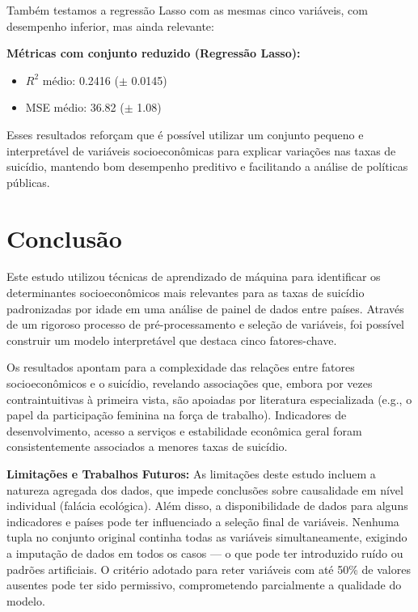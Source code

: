 \documentclass[letterpaper]{article}
\begin{document}
Também testamos a regressão Lasso com as mesmas cinco variáveis, com desempenho inferior, mas ainda relevante:

\vspace{0.5em}
\noindent
\textbf{Métricas com conjunto reduzido (Regressão Lasso):}
\begin{itemize}
\item $R^2$ médio: 0.2416 ($\pm$ 0.0145)
\item MSE médio: 36.82 ($\pm$ 1.08)
\end{itemize}

Esses resultados reforçam que é possível utilizar um conjunto pequeno e interpretável de variáveis socioeconômicas para explicar variações nas taxas de suicídio, mantendo bom desempenho preditivo e facilitando a análise de políticas públicas.

\section{Conclusão}

Este estudo utilizou técnicas de aprendizado de máquina para identificar os determinantes socioeconômicos mais relevantes para as taxas de suicídio padronizadas por idade em uma análise de painel de dados entre países. Através de um rigoroso processo de pré-processamento e seleção de variáveis, foi possível construir um modelo interpretável que destaca cinco fatores-chave.

Os resultados apontam para a complexidade das relações entre fatores socioeconômicos e o suicídio, revelando associações que, embora por vezes contraintuitivas à primeira vista, são apoiadas por literatura especializada (e.g., o papel da participação feminina na força de trabalho). Indicadores de desenvolvimento, acesso a serviços e estabilidade econômica geral foram consistentemente associados a menores taxas de suicídio.

\textbf{Limitações e Trabalhos Futuros:} As limitações deste estudo incluem a natureza agregada dos dados, que impede conclusões sobre causalidade em nível individual (falácia ecológica). Além disso, a disponibilidade de dados para alguns indicadores e países pode ter influenciado a seleção final de variáveis. Nenhuma tupla no conjunto original continha todas as variáveis simultaneamente, exigindo a imputação de dados em todos os casos — o que pode ter introduzido ruído ou padrões artificiais. O critério adotado para reter variáveis com até 50\% de valores ausentes pode ter sido permissivo, comprometendo parcialmente a qualidade do modelo.
\end{document}
